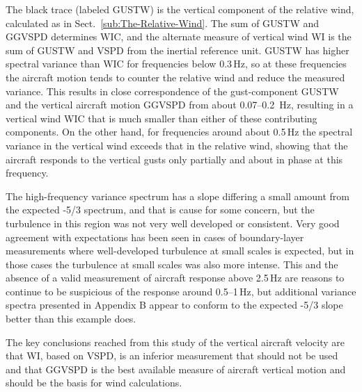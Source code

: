 \documentclass[12pt,twoside,english]{article}\usepackage[]{graphicx}\usepackage[]{color}
\begin{document}
The black trace (labeled GUSTW) is the vertical component of the relative wind, calculated as in Sect.~\ref{sub:The-Relative-Wind}. The sum of GUSTW and GGVSPD determines WIC, and the alternate measure of vertical wind WI is the sum of GUSTW and VSPD from the inertial reference unit. GUSTW has higher spectral variance than WIC for frequencies below 0.3\,Hz, so at these frequencies the aircraft motion tends to counter the relative wind and reduce the measured variance. This results in close correspondence of the gust-component GUSTW and the vertical aircraft motion GGVSPD from about 0.07--0.2~Hz, resulting in a vertical wind WIC that is much smaller than either of these contributing components. On the other hand, for frequencies around about 0.5\,Hz the spectral variance in the vertical wind exceeds that in the relative wind, showing that the aircraft responds to the vertical gusts only partially and about in phase at this frequency. 

The high-frequency variance spectrum has a slope differing a small amount from the expected -5/3 spectrum, and that is cause for some concern, but the turbulence in this region was not very well developed or consistent. Very good agreement with expectations has been seen in cases of boundary-layer measurements where well-developed turbulence at small scales is expected, but in those cases the turbulence at small scales was also more intense. This and the absence of a valid measurement of aircraft response above 2.5\,Hz are reasons to continue to be suspicious of the response around 0.5--1\,Hz, but additional variance spectra presented in Appendix B appear to conform to the expected -5/3 slope  better than this example does. %

The key conclusions reached from this study of the vertical aircraft velocity are that WI, based on VSPD, is an inferior measurement that should not be used and that GGVSPD is the best available measure of aircraft vertical motion and should be the basis for wind calculations.
\end{document}
